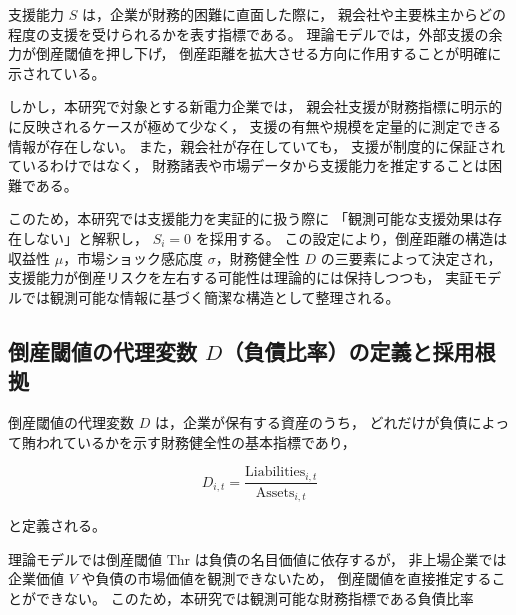 支援能力 $S$ は，企業が財務的困難に直面した際に，
親会社や主要株主からどの程度の支援を受けられるかを表す指標である。
理論モデルでは，外部支援の余力が倒産閾値を押し下げ，
倒産距離を拡大させる方向に作用することが明確に示されている。

しかし，本研究で対象とする新電力企業では，
親会社支援が財務指標に明示的に反映されるケースが極めて少なく，
支援の有無や規模を定量的に測定できる情報が存在しない。
また，親会社が存在していても，
支援が制度的に保証されているわけではなく，
財務諸表や市場データから支援能力を推定することは困難である。

このため，本研究では支援能力を実証的に扱う際に
「観測可能な支援効果は存在しない」と解釈し，
$S_i = 0$ を採用する。
この設定により，倒産距離の構造は
収益性 $\mu$，市場ショック感応度 $\sigma$，財務健全性 $D$ の三要素によって決定され，
支援能力が倒産リスクを左右する可能性は理論的には保持しつつも，
実証モデルでは観測可能な情報に基づく簡潔な構造として整理される。


\subsection{倒産閾値の代理変数 $D$（負債比率）の定義と採用根拠}

倒産閾値の代理変数 $D$ は，企業が保有する資産のうち，
どれだけが負債によって賄われているかを示す財務健全性の基本指標であり，



\[
D_{i,t}=\frac{\text{Liabilities}_{i,t}}{\text{Assets}_{i,t}}
\]



と定義される。

理論モデルでは倒産閾値 $\mathrm{Thr}$ は負債の名目価値に依存するが，
非上場企業では企業価値 $V$ や負債の市場価値を観測できないため，
倒産閾値を直接推定することができない。
このため，本研究では観測可能な財務指標である負債比率
